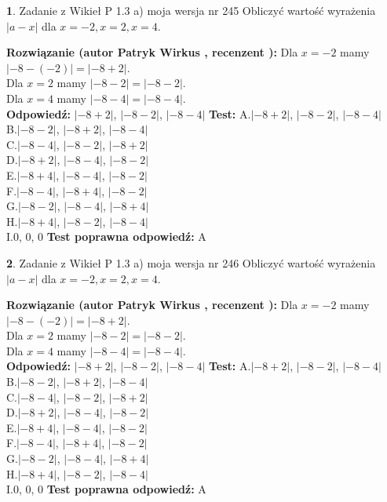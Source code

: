 \documentclass[12pt, a4paper]{article}
\theoremstyle{definition} %
\newtheorem{zad}{}
\newcommand{\zadStart}[1]{\begin{zad}#1\newline}
\newcommand{\zadStop}{\end{zad}}
\newcommand{\rozwStart}[2]{\noindent \textbf{Rozwiązanie (autor #1 , recenzent #2): }\newline}
\newcommand{\rozwStop}{\newline}
\newcommand{\odpStart}{\noindent \textbf{Odpowiedź:}\newline}
\newcommand{\odpStop}{\newline}
\newcommand{\testStart}{\noindent \textbf{Test:}\newline}
\newcommand{\testStop}{\newline}
\newcommand{\kluczStart}{\noindent \textbf{Test poprawna odpowiedź:}\newline}
\newcommand{\kluczStop}{\newline}
\begin{document}
\zadStart{Zadanie z Wikieł P 1.3 a) moja wersja nr 245}
Obliczyć wartość wyrażenia $|a - x|$ dla $x=-2,x=2,x=4$.
\zadStop
\rozwStart{Patryk Wirkus}{}
Dla $x = -2$ mamy $|-8 - (-2)| = |-8 + 2|$.\\
Dla $x = 2$ mamy $|-8 - 2| = |-8 - 2|$.\\
Dla $x = 4$ mamy $|-8 - 4| = |-8 - 4|$.\\
\rozwStop
\odpStart
$|-8 + 2|$, $|-8 - 2|$, $|-8 - 4|$
\odpStop
\testStart
A.$|-8 + 2|$, $|-8 - 2|$, $|-8 - 4|$\\
B.$|-8 - 2|$, $|-8 + 2|$, $|-8 - 4|$\\
C.$|-8 - 4|$, $|-8 - 2|$, $|-8 + 2|$\\
D.$|-8 + 2|$, $|-8 - 4|$, $|-8 - 2|$\\
E.$|-8 + 4|$, $|-8 - 4|$, $|-8 - 2|$\\
F.$|-8 - 4|$, $|-8 + 4|$, $|-8 - 2|$\\
G.$|-8 - 2|$, $|-8 - 4|$, $|-8 + 4|$\\
H.$|-8 + 4|$, $|-8 - 2|$, $|-8 - 4|$\\
I.$0$, $0$, $0$
\testStop
\kluczStart
A
\kluczStop



\zadStart{Zadanie z Wikieł P 1.3 a) moja wersja nr 246}
Obliczyć wartość wyrażenia $|a - x|$ dla $x=-2,x=2,x=4$.
\zadStop
\rozwStart{Patryk Wirkus}{}
Dla $x = -2$ mamy $|-8 - (-2)| = |-8 + 2|$.\\
Dla $x = 2$ mamy $|-8 - 2| = |-8 - 2|$.\\
Dla $x = 4$ mamy $|-8 - 4| = |-8 - 4|$.\\
\rozwStop
\odpStart
$|-8 + 2|$, $|-8 - 2|$, $|-8 - 4|$
\odpStop
\testStart
A.$|-8 + 2|$, $|-8 - 2|$, $|-8 - 4|$\\
B.$|-8 - 2|$, $|-8 + 2|$, $|-8 - 4|$\\
C.$|-8 - 4|$, $|-8 - 2|$, $|-8 + 2|$\\
D.$|-8 + 2|$, $|-8 - 4|$, $|-8 - 2|$\\
E.$|-8 + 4|$, $|-8 - 4|$, $|-8 - 2|$\\
F.$|-8 - 4|$, $|-8 + 4|$, $|-8 - 2|$\\
G.$|-8 - 2|$, $|-8 - 4|$, $|-8 + 4|$\\
H.$|-8 + 4|$, $|-8 - 2|$, $|-8 - 4|$\\
I.$0$, $0$, $0$
\testStop
\kluczStart
A
\kluczStop
\end{document}

